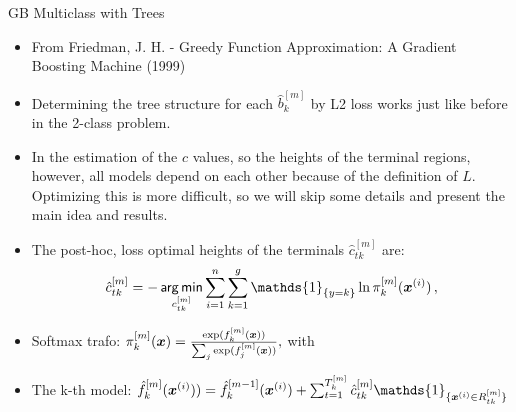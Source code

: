 \begin{vbframe}{GB Multiclass with Trees}

\begin{itemize}
  \item From Friedman, J. H. - Greedy Function Approximation: A Gradient Boosting Machine (1999)
  \item Determining the tree structure for each $\hat{b}^{[m]}_k$ by L2 loss works just like before in the 2-class problem.
\item In the estimation of the $c$ values, so the heights of the terminal regions, however, all models depend on each other because of the definition
of $L$. Optimizing this is more difficult, so we will skip some details and present the main idea and results.
\end{itemize}

\framebreak

\begin{itemize}
  \item The post-hoc, loss optimal heights of the terminals $\hat{c}_{tk}^{[m]}$ are:
  $$ 
  \hat{c}_{tk}^{[m]} = - \argmin_{c_{tk}^{[m]} } \sum_{i=1}^n \sum_{k=1}^g \mathds{1}_{\{y = k\}} \ln \pi_k^{[m]}(\xv^{(i)}) \,,
  $$
\item Softmax trafo: $\pi_k^{[m]}(\bm{x}) = \frac{\exp(f_k^{[m]}(\bm{x}))}{\sum_j \exp(f_j^{[m]}(\bm{x}))},$ with 
\item The k-th model:
  $
  \hat{f}_k^{[m]}(\xv^{(i)})) = \hat{f}_k^{[m-1]}(\xv^{(i)}) + \sum_{t=1}^{T_k^{[m]}} \hat{c}_{tk}^{[m]} \mathds{1}_{\{\xv^{(i)} \in R_{tk}^{[m]}\}} 
  $

\end{itemize}







\end{vbframe}
